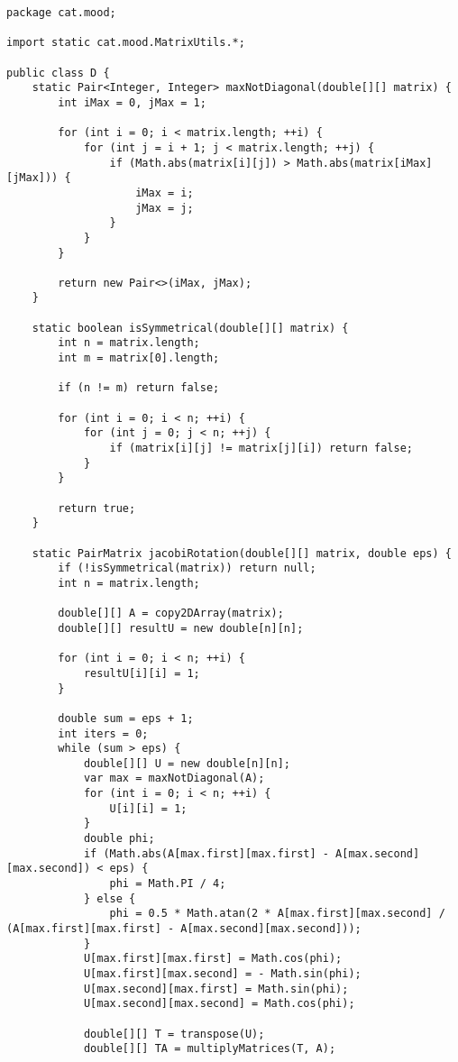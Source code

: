 \begin{verbatim}
package cat.mood;

import static cat.mood.MatrixUtils.*;

public class D {
    static Pair<Integer, Integer> maxNotDiagonal(double[][] matrix) {
        int iMax = 0, jMax = 1;

        for (int i = 0; i < matrix.length; ++i) {
            for (int j = i + 1; j < matrix.length; ++j) {
                if (Math.abs(matrix[i][j]) > Math.abs(matrix[iMax][jMax])) {
                    iMax = i;
                    jMax = j;
                }
            }
        }

        return new Pair<>(iMax, jMax);
    }

    static boolean isSymmetrical(double[][] matrix) {
        int n = matrix.length;
        int m = matrix[0].length;

        if (n != m) return false;

        for (int i = 0; i < n; ++i) {
            for (int j = 0; j < n; ++j) {
                if (matrix[i][j] != matrix[j][i]) return false;
            }
        }

        return true;
    }

    static PairMatrix jacobiRotation(double[][] matrix, double eps) {
        if (!isSymmetrical(matrix)) return null;
        int n = matrix.length;

        double[][] A = copy2DArray(matrix);
        double[][] resultU = new double[n][n];

        for (int i = 0; i < n; ++i) {
            resultU[i][i] = 1;
        }

        double sum = eps + 1;
        int iters = 0;
        while (sum > eps) {
            double[][] U = new double[n][n];
            var max = maxNotDiagonal(A);
            for (int i = 0; i < n; ++i) {
                U[i][i] = 1;
            }
            double phi;
            if (Math.abs(A[max.first][max.first] - A[max.second][max.second]) < eps) {
                phi = Math.PI / 4;
            } else {
                phi = 0.5 * Math.atan(2 * A[max.first][max.second] / (A[max.first][max.first] - A[max.second][max.second]));
            }
            U[max.first][max.first] = Math.cos(phi);
            U[max.first][max.second] = - Math.sin(phi);
            U[max.second][max.first] = Math.sin(phi);
            U[max.second][max.second] = Math.cos(phi);

            double[][] T = transpose(U);
            double[][] TA = multiplyMatrices(T, A);


\end{verbatim}
